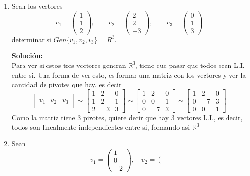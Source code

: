 \documentclass[12pt]{article}
\newenvironment{solucion}
{\begin{mdframed}[backgroundcolor=black!10]
		{\bf Solución:}\\
	}
	{
	\end{mdframed}
}
\newenvironment{preguntas}
{\begin{enumerate}\itemsep12pt
	}
	{
	\end{enumerate}
}
\newcommand{\R}{\mathbb{R}}
\begin{document}
\begin{preguntas}
\begin{solucion}
		En resumen, las condiciones son
		$$a \neq 0, \quad a \neq 1$$
\end{solucion}
\item Sean los vectores 
	$$
	v_1 = \begin{pmatrix}
	1\\
	1\\
	2
	\end{pmatrix};\qquad
	v_2 = \begin{pmatrix}
	2\\
	2\\
	-3
	\end{pmatrix}; \qquad
	v_3 = \begin{pmatrix}
	0\\
	1\\
	3
	\end{pmatrix}$$
	determinar si $Gen\{v_1, v_2, v_3\} = R^3$.
\begin{solucion}
Para ver si estos tres vectores generan $\R^3$, tiene que pasar que todos sean L.I. entre si. Una forma de ver esto, es formar una matriz con los vectores y ver la cantidad de pivotes que hay, es decir
		$$\begin{bmatrix}
			\\
			v_1 & v_2 & v_3\\
			&&
		\end{bmatrix} \sim 
		\begin{bmatrix}
		1 & 2 & 0\\
		1 & 2 & 1\\
		2 & -3 & 3
		\end{bmatrix} \sim
		\begin{bmatrix}
		1 & 2 & 0\\
		0 & 0 & 1\\
		0 & -7 & 3
		\end{bmatrix} \sim
		\begin{bmatrix}
		1 & 2 & 0\\
		0 & -7 & 3\\
		0 & 0 & 1
		\end{bmatrix}$$
		Como la matriz tiene 3 pivotes, quiere decir que hay 3 vectores L.I., es decir, todos son linealmente independientes entre si, formando asi $\R^3$
\end{solucion}
\item Sean 
$$v_1=\left(\begin{array}{r}
  1\\0\\-2
\end{array}\right), \quad v_2=\left(\begin{array}{r}

\end{array}$$
\end{preguntas}
\end{document}
